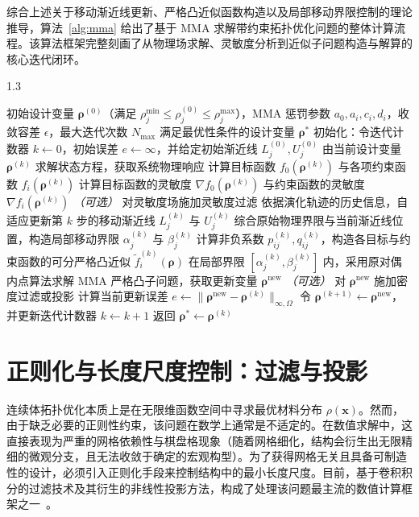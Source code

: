 综合上述关于移动渐近线更新、严格凸近似函数构造以及局部移动界限控制的理论推导，算法~\ref{alg:mma} 给出了基于 MMA 求解带约束拓扑优化问题的整体计算流程。该算法框架完整刻画了从物理场求解、灵敏度分析到近似子问题构造与解算的核心迭代闭环。
\begin{algorithm}[h]
	\caption{MMA 求解带约束的拓扑优化问题}
	\label{alg:mma}
	\begin{spacing}{1.3}
		\begin{algorithmic}[1]
			\Require 初始设计变量 $\boldsymbol{\rho}^{(0)}$（满足 $\rho_j^{\min} \leq \rho_j^{(0)} \leq \rho_j^{\max}$），MMA 惩罚参数 $a_0, a_i, c_i, d_i$，收敛容差 $\epsilon$，最大迭代次数 $N_{\max}$
			\Ensure 满足最优性条件的设计变量 $\boldsymbol{\rho}^*$
			\State 初始化：令迭代计数器 $k \gets 0$，初始误差 $e \gets \infty$，并给定初始渐近线 $L_j^{(0)}, U_j^{(0)}$
			\State 由当前设计变量 $\boldsymbol{\rho}^{(k)}$ 求解状态方程，获取系统物理响应
			\State 计算目标函数 $f_0(\boldsymbol{\rho}^{(k)})$ 与各项约束函数 $f_i(\boldsymbol{\rho}^{(k)})$
			\State 计算目标函数的灵敏度 $\nabla f_0(\boldsymbol{\rho}^{(k)})$ 与约束函数的灵敏度 $\nabla f_i(\boldsymbol{\rho}^{(k)})$
			\State \textit{（可选）} 对灵敏度场施加灵敏度过滤
			\State 依据演化轨迹的历史信息，自适应更新第 $k$ 步的移动渐近线 $L_j^{(k)}$ 与 $U_j^{(k)}$
			\State 综合原始物理界限与当前渐近线位置，构造局部移动界限 $\alpha_j^{(k)}$ 与 $\beta_j^{(k)}$
			\State 计算非负系数 $p_{ij}^{(k)}, q_{ij}^{(k)}$，构造各目标与约束函数的可分严格凸近似 $\tilde{f}_i^{(k)}(\boldsymbol{\rho})$
			\State 在局部界限 $[\alpha_j^{(k)}, \beta_j^{(k)}]$ 内，采用原对偶内点算法求解 MMA 严格凸子问题，获取更新变量 $\boldsymbol{\rho}^{\mathrm{new}}$
			\State \textit{（可选）} 对 $\boldsymbol{\rho}^{\mathrm{new}}$ 施加密度过滤或投影
			\State 计算当前更新误差 $e \gets \|\boldsymbol{\rho}^{\mathrm{new}} - \boldsymbol{\rho}^{(k)}\|_{\infty,\Omega}$
			\State 令 $\boldsymbol{\rho}^{(k+1)} \gets \boldsymbol{\rho}^{\mathrm{new}}$，并更新迭代计数器 $k \gets k + 1$
			\EndWhile
			\State 返回 $\boldsymbol{\rho}^* \gets \boldsymbol{\rho}^{(k)}$
		\end{algorithmic}
	\end{spacing}
\end{algorithm}


\section{正则化与长度尺度控制：过滤与投影}
\label{sec:regularization}

连续体拓扑优化本质上是在无限维函数空间中寻求最优材料分布 $\rho(\boldsymbol{x})$。然而，由于缺乏必要的正则性约束，该问题在数学上通常是不适定的。在数值求解中，这直接表现为严重的网格依赖性与棋盘格现象（随着网格细化，结构会衍生出无限精细的微观分支，且无法收敛于确定的宏观构型）。为了获得网格无关且具备可制造性的设计，必须引入正则化手段来控制结构中的最小长度尺度。目前，基于卷积积分的过滤技术及其衍生的非线性投影方法，构成了处理该问题最主流的数值计算框架之一~\cite{sigmundMorphologybasedBlackWhite2007b}。 


